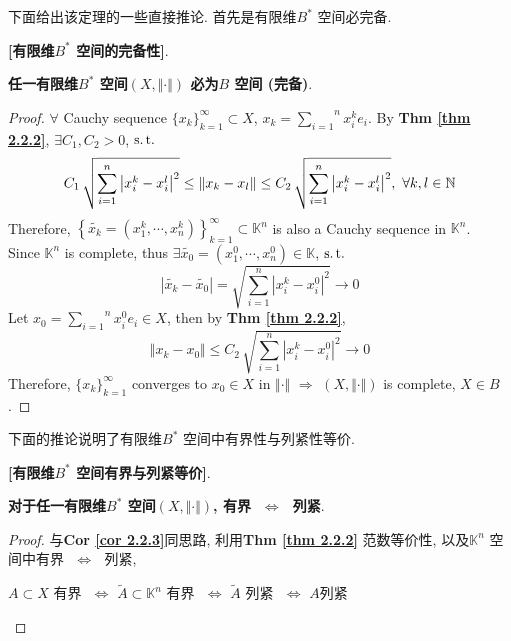	\newpage
	
	下面给出该定理的一些直接推论. 首先是有限维$B^*$ 空间必完备.
	
	\begin{corollary}\label{cor 2.2.3}
		\textbf{[有限维$B^*$ 空间的完备性]}. 
		\begin{center}
			\textbf{任一有限维$B^*$ 空间$(X , \Vert \cdot \Vert)$ 必为$B$ 空间 (完备)}.
		\end{center}
		
		\vspace{4em}
		
		\begin{proof}
			$\forall$ Cauchy sequence $\{ x_k \}_{k = 1}^{\infty} \subset X$, $x_k = \overset{n}{\underset{i = 1}{\sum}} x_{i}^k e_i$. By \textbf{Thm \ref{thm 2.2.2}}, $\exists C_1 , C_2 > 0$, $\operatorname{s.t.}$
			\[ C_1 \, \sqrt{\sum_{i = 1}^n {\left| x_{i}^k - x_{i}^l \right|^2}} \leq \Vert x_k - x_l \Vert \leq C_2 \, \sqrt{\sum_{i = 1}^n \left| x_{i}^k - x_{i}^l \right|^2} , \,\, \forall k , l \in \mathbb{N} \]
			Therefore, $\left\{ \widetilde{x_k} = \left( x_{1}^k , \cdots , x_{n}^k \right) \right\}_{k = 1}^{\infty} \subset \mathbb{K}^n$ is also a Cauchy sequence in $\mathbb{K}^n$. \\
			Since $\mathbb{K}^n$ is complete, thus $\exists \widetilde{x_0} = \left( x_{1}^0 , \cdots , x_{n}^0 \right) \in \mathbb{K}$, $\operatorname{s.t.}$
			\[ \left| \widetilde{x_k} - \widetilde{x_0} \right| = \sqrt{\sum_{i = 1}^n \left| x_{i}^k - x_{i}^0 \right|^2} \to 0 \]
			Let $x_0 = \overset{n}{\underset{i = 1}{\sum}} x_{i}^0 e_i \in X$, then by \textbf{Thm \ref{thm 2.2.2}}, 
			\[ \Vert x_k - x_0 \Vert \leq C_2 \, \sqrt{\sum_{i = 1}^n \left| x_{i}^k - x_{i}^0 \right|^2} \to 0 \]
			Therefore, $\{ x_k \}_{k = 1}^{\infty}$ converges to $x_0 \in X$ in $\Vert \cdot \Vert \,\, \Rightarrow \,\, (X , \Vert \cdot \Vert)$ is complete, $X \in B$.
		\end{proof}
	\end{corollary}
	
	\vspace{10em}
	
	下面的推论说明了有限维$B^*$ 空间中有界性与列紧性等价. 
	
	\begin{corollary}\label{cor 2.2.4}
		\textbf{[有限维$B^*$ 空间有界与列紧等价]}. 
		\begin{center}
			\textbf{对于任一有限维$B^*$ 空间$(X , \Vert \cdot \Vert)$,  有界 $\,\, \Leftrightarrow \,\,$ 列紧}. 
		\end{center}
	
		\vspace{4em}
		
		\begin{proof}
			与\textbf{Cor \ref{cor 2.2.3}}同思路, 利用\textbf{Thm \ref{thm 2.2.2}} 范数等价性, 以及$\mathbb{K}^n$ 空间中有界 $\,\, \Leftrightarrow \,\,$ 列紧, 
			\begin{center}
				$A \subset X$ 有界 $\,\, \Leftrightarrow \,\, \widetilde{A} \subset \mathbb{K}^n$ 有界 $\,\, \Leftrightarrow \,\, \widetilde{A}$ 列紧 $\,\, \Leftrightarrow \,\, A$列紧
			\end{center}
		\end{proof}
	\end{corollary}

